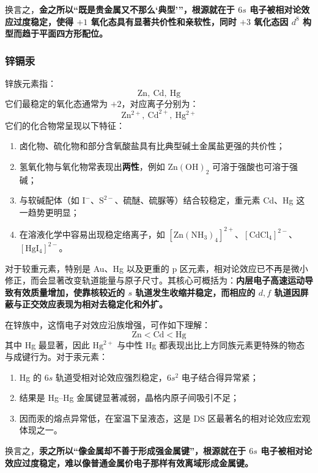\documentclass[UTF8]{ctexbook}
\begin{document}
换言之，\textbf{金之所以“既是贵金属又不那么‘典型’”，根源就在于 $6s$ 电子被相对论效应过度稳定，使得 $+1$ 氧化态具有显著共价性和亲软性，同时 $+3$ 氧化态因 $d^8$ 构型而趋于平面四方形配位。}

\subsubsection{锌镉汞}

锌族元素指：
\[
\mathrm{Zn,\ Cd,\ Hg}
\]
它们最稳定的氧化态通常为 $+2$，对应离子分别为：
\[
\mathrm{Zn^{2+},\ Cd^{2+},\ Hg^{2+}}
\]
它们的化合物常呈现以下特征：
\begin{enumerate}
  \item 卤化物、硫化物和部分含氧酸盐具有比典型碱土金属盐更强的共价性；
  \item 氢氧化物与氧化物常表现出\textbf{两性}，例如 $\mathrm{Zn(OH)_2}$ 可溶于强酸也可溶于强碱；
  \item 与软碱配体（如 $\mathrm{I^-}$、$\mathrm{S^{2-}}$、硫醚、硫脲等）结合较稳定，重元素 Cd、Hg 这一趋势更明显；
  \item 在溶液化学中容易出现稳定络离子，如 $\mathrm{[Zn(NH_3)_4]^{2+}}$、$\mathrm{[CdCl_4]^{2-}}$、$\mathrm{[HgI_4]^{2-}}$。
\end{enumerate}

对于较重元素，特别是 Au、Hg 以及更重的 p 区元素，相对论效应已不再是微小修正，而会显著改变轨道能量与原子尺寸。其核心可概括为：\textbf{内层电子高速运动导致有效质量增加，使靠核较近的 $s$ 轨道发生收缩并稳定，而相应的 $d,f$ 轨道因屏蔽与正交效应表现为相对去稳定化和外扩。}

在锌族中，这惰电子对效应沿族增强，可作如下理解：
\[
\mathrm{Zn < Cd < Hg}
\]
其中 Hg 最显著，因此 $\mathrm{Hg^{2+}}$ 与中性 Hg 都表现出比上方同族元素更特殊的物态与成键行为。对于汞元素：
\begin{enumerate}
  \item Hg 的 $6s$ 轨道受相对论效应强烈稳定，$6s^2$ 电子结合得异常紧；
  \item 结果是 Hg--Hg 金属键显著减弱，晶格内原子间吸引不足；
  \item 因而汞的熔点异常低，在室温下呈液态，这是 DS 区最著名的相对论效应宏观体现之一。
\end{enumerate}

换言之，\textbf{汞之所以“像金属却不善于形成强金属键”，根源就在于 $6s$ 电子被相对论效应过度稳定，难以像普通金属价电子那样有效离域形成金属键。}





\newpage
\end{document}
